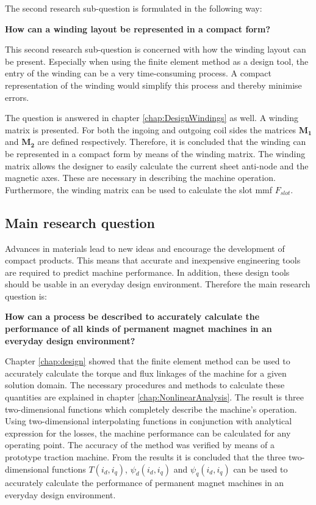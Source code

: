 The second research sub-question is formulated in the following way: \newline 
\begin{minipage}{\textwidth}
\vspace{12pt}
\textbf{How can a winding layout be represented in a compact form?}  
\vspace{12pt}
\end{minipage}
This second research sub-question is concerned with how the winding layout can be present. Especially when using the finite element method as a design tool, the entry of the winding can be a very time-consuming process. A compact representation of the winding would simplify this process and thereby minimise errors. 

The question is answered in chapter \ref{chap:DesignWindings} as well. A winding matrix is presented. For both the ingoing and outgoing coil sides the matrices $\mathbf{M_1}$ and $\mathbf{M_2}$ are defined respectively. Therefore, it is concluded that the winding can be represented in a compact form by means of the winding matrix. The winding matrix allows the designer to easily calculate the current sheet anti-node and the magnetic axes. These are necessary in describing the machine operation. Furthermore, the winding matrix can be used to calculate the slot mmf $F_{slot}$.  

\subsection{Main research question}
Advances in materials lead to new ideas and encourage the development of compact products. This means that accurate and inexpensive engineering tools are required to predict machine performance. In addition, these design tools should be usable in an everyday design environment. Therefore the main research question is: \newline
\begin{minipage}{\textwidth}
\vspace{12pt}
\textbf{How can a process be described to accurately calculate the performance of all kinds of permanent magnet machines in an everyday design environment?}
\vspace{12pt}
\end{minipage} 
Chapter \ref{chap:design} showed that the finite element method can be used to accurately calculate the torque and flux linkages of the machine for a given solution domain. The necessary procedures and methods to calculate these quantities are explained in chapter \ref{chap:NonlinearAnalysis}. The result is three two-dimensional functions which completely describe the machine's operation. Using two-dimensional interpolating functions in conjunction with analytical expression for the losses, the machine performance can be calculated for any operating point. The accuracy of the method was verified by means of a prototype traction machine. From the results it is concluded that the three two-dimensional functions $T(i_d,i_q)$, $\psi_d(i_d,i_q)$ and $\psi_q(i_d,i_q)$ can be used to accurately calculate the performance of permanent magnet machines in an everyday design environment.    

